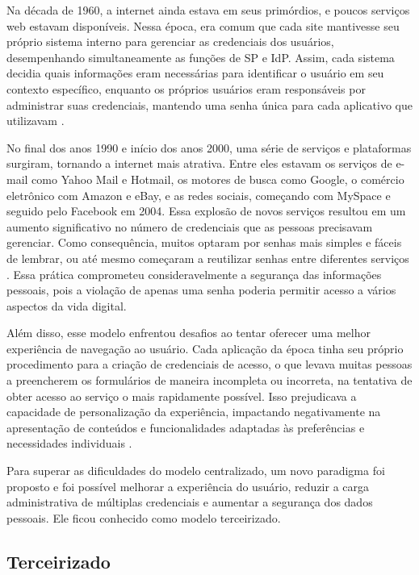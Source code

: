 Na década de 1960, a internet ainda estava em seus primórdios, e poucos serviços web estavam disponíveis. Nessa época, era comum que cada site mantivesse seu próprio sistema interno para gerenciar as credenciais dos usuários, desempenhando simultaneamente as funções de \acs{SP} e \acs{IdP}. Assim, cada sistema decidia quais informações eram necessárias para identificar o usuário em seu contexto específico, enquanto os próprios usuários eram responsáveis por administrar suas credenciais, mantendo uma senha única para cada aplicativo que utilizavam \cite{wangham2008gerenciamento}. 

No final dos anos 1990 e início dos anos 2000, uma série de serviços e plataformas surgiram, tornando a internet mais atrativa. Entre eles estavam os serviços de e-mail como Yahoo Mail e Hotmail, os motores de busca como Google, o comércio eletrônico com Amazon e eBay, e as redes sociais, começando com MySpace e seguido pelo Facebook em 2004. Essa explosão de novos serviços resultou em um aumento significativo no número de credenciais que as pessoas precisavam gerenciar. Como consequência, muitos optaram por senhas mais simples e fáceis de lembrar, ou até mesmo começaram a reutilizar senhas entre diferentes serviços \cite{evernym2024}. Essa prática comprometeu consideravelmente a segurança das informações pessoais, pois a violação de apenas uma senha poderia permitir acesso a vários aspectos da vida digital.

Além disso, esse modelo enfrentou desafios ao tentar oferecer uma melhor experiência de navegação ao usuário. Cada aplicação da época tinha seu próprio procedimento para a criação de credenciais de acesso, o que levava muitas pessoas a preencherem os formulários de maneira incompleta ou incorreta, na tentativa de obter acesso ao serviço o mais rapidamente possível. Isso prejudicava a capacidade de personalização da experiência, impactando negativamente na apresentação de conteúdos e funcionalidades adaptadas às preferências e necessidades individuais \cite{wangham2008gerenciamento}.

Para superar as dificuldades do modelo centralizado, um novo paradigma foi proposto e foi possível melhorar a experiência do usuário, reduzir a carga administrativa de múltiplas credenciais e aumentar a segurança dos dados pessoais. Ele ficou conhecido como modelo terceirizado.

\subsection{Terceirizado}\label{subsection:terceirizado}

